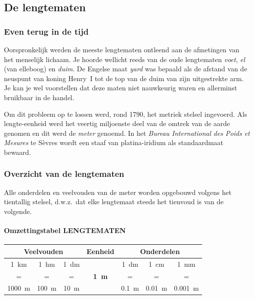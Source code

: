 \documentclass{bis}
\begin{document}

\subsection{De lengtematen}

\subsubsection{Even terug in de tijd}
Oorspronkelijk werden de meeste lengtematen ontleend aan de afmetingen van het menselijk lichaam. Je hoorde wellicht reeds van de oude lengtematen \emph{voet}, \emph{el} (van elleboog) en \emph{duim}. De Engelse maat \emph{yard} was bepaald als de afstand van de neuspunt van koning Henry~I tot de top van de duim van zijn uitgestrekte arm. Je kan je wel voorstellen dat deze maten niet nauwkeurig waren en allerminst bruikbaar in de handel.

Om dit probleem op te lossen werd, rond 1790, het metriek stelsel ingevoerd. Als lengte-eenheid werd het veertig miljoenste deel van de omtrek van de aarde genomen en dit werd de \emph{meter} genoemd. In het \emph{Bureau International des Poids et Mesures} te Sèvres wordt een staaf van platina-iridium als standaardmaat bewaard.

\subsubsection{Overzicht van de lengtematen}
Alle onderdelen en veelvouden van de meter worden opgebouwd volgens het tientallig stelsel, d.w.z.\ dat elke lengtemaat steeds het tienvoud is van de volgende.

\paragraph{Omzettingstabel LENGTEMATEN}
\begin{center}
\renewcommand{\arraystretch}{1.2}\setlength{\tabcolsep}{4pt}%
\begin{tabular}{*{7}{c}}
  \multicolumn{3}{c}{\textbf{Veelvouden}} & \textbf{Eenheid} & \multicolumn{3}{c}{\textbf{Onderdelen}}\\
  \midrule
\SI{1}{\kilo\metre} & \SI{1}{\hecto\metre} & \SI{1}{\deca\metre} &  & \SI{1}{\deci\metre} & \SI{1}{\centi\metre} & \SI{1}{\milli\metre}\\
= & = & = & \textbf{\SI{1}{\metre}} & = & = & =\\
\SI{1000}{\metre} & \SI{100}{\metre} & \SI{10}{\metre} & & \SI{0.1}{\metre} & \SI{0.01}{\metre} & \SI{0.001}{\metre}
\end{tabular}%
\end{center}
\end{document}
